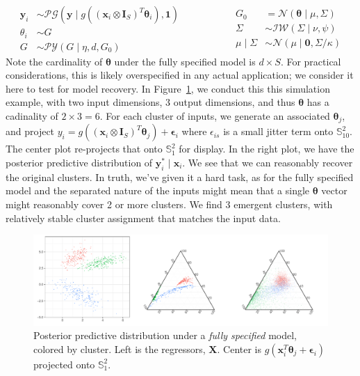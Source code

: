     \begin{equation}
        \label{eqn:regressionmodel}
        \begin{aligned}
            \bm{y}_i &\sim \mathcal{PG}\left(\bm{y}\mid g\left((\bm{x}_i\otimes\bm{I}_S)^T\bm{\theta}_i\right), \bm{1}\right)\\
            \theta_i &\sim G\\
            G &\sim \mathcal{PY}(G\mid\eta, d, G_0)
        \end{aligned}
        ~\hspace{2cm}
        \begin{aligned}
            G_0 &= \mathcal{N}(\bm{\theta} \mid \mu, \Sigma)\\
            \Sigma &\sim \mathcal{IW}(\Sigma\mid \nu, \psi)\\
            \mu\mid\Sigma &\sim \mathcal{N}(\mu\mid \bm{0}, \Sigma / \kappa)
        \end{aligned}
    \end{equation}
    Note the cardinality of $\bm{\theta}$ under the fully specified model is $d\times S$.  For practical
    considerations, this is likely overspecified in any actual application; we consider it here to test
    for model recovery.  In Figure~\ref{fig:simreg}, we conduct this this simulation example, with two
    input dimensions, 3 output dimensions, and thus $\bm{\theta}$ has a cadinality of $2\times 3 = 6$.
    For each cluster of inputs, we generate an associated $\bm{\theta}_j$, and project 
    $y_i = g\left((\bm{x}_i\otimes\bm{I}_S)^T\bm{\theta}_j\right) + \bm{\epsilon}_i$ where 
    $\epsilon_{is}$ is a small jitter term onto 
    $\mathbb{S}_{10}^{2}$.  The center plot re-projects that onto $\mathbb{S}_1^{2}$ for display.
    In the right plot, we have the posterior predictive distribution of $\bm{y}_i^{*}\mid \bm{x}_i$.
    We see that we can reasonably recover the original clusters.  In truth, we've given it a hard
    task, as for the fully specified model and the separated nature of the inputs might mean that 
    a single $\bm{\theta}$ vector might reasonably cover 2 or more clusters.  We find 3 emergent
    clusters, with relatively stable cluster assignment that matches the input data.

\begin{figure}[t]
    \centering
    \caption{Posterior predictive distribution under a \emph{fully specified} model, colored 
        by cluster.  Left is the regressors, $\bm{X}$.  Center is 
        $g(\bm{x}_i^T\bm{\theta}_j + \bm{\epsilon}_i)$ projected onto $\mathbb{S}_1^2$.
        \label{fig:simreg}}
    \includegraphics[width = \textwidth]{plots/simulated_reg}
\end{figure}

